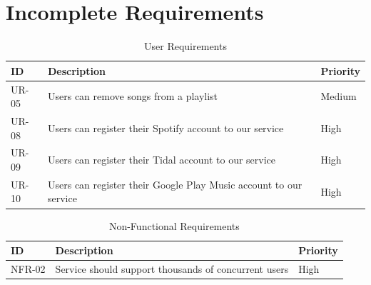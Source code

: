 \documentclass[12pt]{article}
\begin{document}
\section{Incomplete Requirements}
\begin{table}[H]
	\centering
	\label{tab:uri}
	\caption*{User Requirements}
	\begin{tabularx}{450pt}{lXl}
		ID & Description & Priority\\\hline
		UR-05 & Users can remove songs from a playlist & Medium \\
		UR-08 & Users can register their Spotify account to our service & High \\
		UR-09 & Users can register their Tidal account to our service & High \\
		UR-10 & Users can register their Google Play Music account to our service & High \\
	\end{tabularx}
\end{table}
\begin{table}[H]
	\centering
	\label{tab:nfri}
	\caption*{Non-Functional Requirements}
	\begin{tabularx}{450pt}{lXl}
		ID & Description & Priority\\\hline
		NFR-02 & Service should support thousands of concurrent users & High \\
	\end{tabularx}
\end{table}
\end{document}
